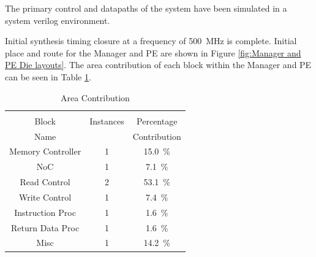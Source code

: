 \documentclass[journal]{IEEEtran}
\begin{document}
The primary control and datapaths of the system have been simulated in a system verilog environment. 

Initial synthesis timing closure at a frequency of \SI{500}{\mega\hertz} is complete.
Initial place and route for the Manager and PE are shown in Figure \ref{fig:Manager and PE Die layouts}. 
The area contribution of each block within the Manager and PE can be seen in Table \ref{tab:Area contribution}.
\begin{table}[h]
  \captionsetup{justification=centering, skip=3pt}
  \caption{Area Contribution}
  \vspace{3pt}
  \label{tab:Area contribution}
  \centering
  \begin{subtable}{0.5\textwidth}
    \centering
    \begin{adjustbox}{width=0.75\textwidth}
      \begin{tabular}{ccc}
        \toprule
                         &          &                                         \\  %
            Block        &Instances &Percentage                               \\  %
            Name         &          &Contribution                             \\  %
        \hline  %
  Memory Controller      & 1&\SI[per-mode=symbol]{15.0}{\percent}  \\ 
        NoC              & 1&\SI[per-mode=symbol]{ 7.1}{\percent}  \\
        Read Control     & 2&\SI[per-mode=symbol]{53.1}{\percent}  \\
        Write Control    & 1&\SI[per-mode=symbol]{ 7.4}{\percent}  \\
      Instruction Proc   & 1&\SI[per-mode=symbol]{ 1.6}{\percent}  \\
      Return Data Proc   & 1&\SI[per-mode=symbol]{ 1.6}{\percent}  \\
        Misc             & 1&\SI[per-mode=symbol]{14.2}{\percent}  \\
        \bottomrule
      \end{tabular}

\end{adjustbox}
\end{subtable}
\end{table}
\end{document}
